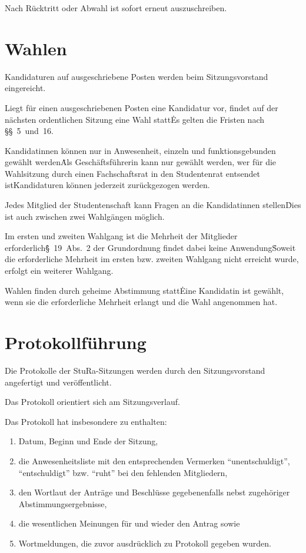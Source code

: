 \begin{multicols}{2}
\Abs \Satz Nach Rücktritt oder Abwahl ist sofort erneut auszuschreiben.



\section{Wahlen}

\Abs \Satz Kandidaturen auf ausgeschriebene Posten werden beim Sitzungsvorstand eingereicht.

\Abs \Satz Liegt für einen ausgeschriebenen Posten eine Kandidatur vor, findet auf der nächsten ordentlichen Sitzung eine Wahl statt\. Es gelten die Fristen nach §§~5~und~16.

\Abs \Satz Kandidatinnen können nur in Anwesenheit, einzeln und funktionsgebunden gewählt werden\. Als Geschäftsführerin kann nur gewählt werden, wer für die Wahlsitzung durch einen Fachschaftsrat in den Studentenrat entsendet ist\. Kandidaturen können jederzeit zurückgezogen werden.

\Abs \Satz Jedes Mitglied der Studentenschaft kann Fragen an die Kandidatinnen stellen\. Dies ist auch zwischen zwei Wahlgängen möglich.

\Abs \Satz Im ersten und zweiten Wahlgang ist die Mehrheit der Mitglieder erforderlich\. §~19~Abs.~2 der Grundordnung findet dabei keine Anwendung\. Soweit die erforderliche Mehrheit im ersten bzw. zweiten Wahlgang nicht erreicht wurde, erfolgt ein weiterer Wahlgang.

\Abs \Satz Wahlen finden durch geheime Abstimmung statt\. Eine Kandidatin ist gewählt, wenn sie die erforderliche Mehrheit erlangt und die Wahl angenommen hat.



\section{Protokollführung}

\Abs \Satz Die Protokolle der StuRa-Sitzungen werden durch den Sitzungsvorstand angefertigt und veröffentlicht.

\Abs \Satz Das Protokoll orientiert sich am Sitzungsverlauf.

\Abs \Satz Das Protokoll hat insbesondere zu enthalten:
\begin{enumerate}
\item Datum, Beginn und Ende der Sitzung,
\item die Anwesenheitsliste mit den entsprechenden Vermerken "`unentschuldigt"', "`entschuldigt"' bzw. "`ruht"' bei den fehlenden Mitgliedern,
\item den Wortlaut der Anträge und Beschlüsse gegebenenfalls nebst zugehöriger Abstimmungsergebnisse,
\item die wesentlichen Meinungen für und wieder den Antrag sowie
\item Wortmeldungen, die zuvor ausdrücklich zu Protokoll gegeben wurden.
\end{enumerate}


\end{multicols}
